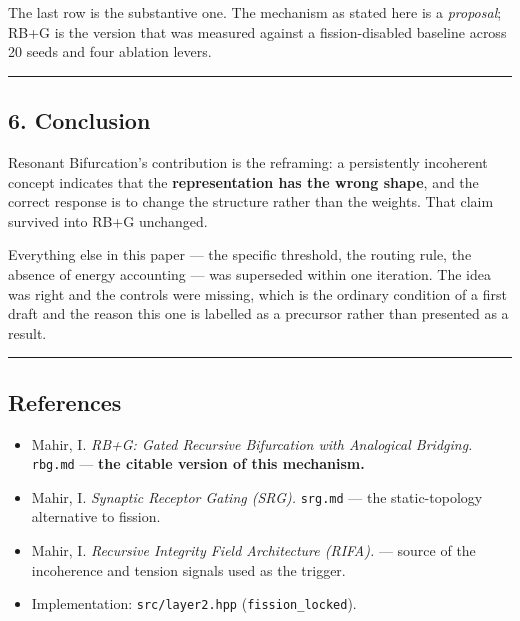 \documentclass[
  11pt,
  a4paper,
]{article}
\providecommand{\tightlist}{%
  \setlength{\itemsep}{0pt}\setlength{\parskip}{0pt}}
\begin{document}
The last row is the substantive one. The mechanism as stated here is a
\emph{proposal}; RB+G is the version that was measured against a
fission-disabled baseline across 20 seeds and four ablation levers.

\begin{center}\rule{0.5\linewidth}{0.5pt}\end{center}

\subsection{6. Conclusion}\label{conclusion}

Resonant Bifurcation's contribution is the reframing: a persistently
incoherent concept indicates that the \textbf{representation has the
wrong shape}, and the correct response is to change the structure rather
than the weights. That claim survived into RB+G unchanged.

Everything else in this paper --- the specific threshold, the routing
rule, the absence of energy accounting --- was superseded within one
iteration. The idea was right and the controls were missing, which is
the ordinary condition of a first draft and the reason this one is
labelled as a precursor rather than presented as a result.

\begin{center}\rule{0.5\linewidth}{0.5pt}\end{center}

\subsection{References}\label{references}

\begin{itemize}
\tightlist
\item
  Mahir, I. \emph{RB+G: Gated Recursive Bifurcation with Analogical
  Bridging.} \texttt{rbg.md} --- \textbf{the citable version of this
  mechanism.}
\item
  Mahir, I. \emph{Synaptic Receptor Gating (SRG).} \texttt{srg.md} ---
  the static-topology alternative to fission.
\item
  Mahir, I. \emph{Recursive Integrity Field Architecture (RIFA).} ---
  source of the incoherence and tension signals used as the trigger.
\item
  Implementation: \texttt{src/layer2.hpp} (\texttt{fission\_locked}).
\end{itemize}
\end{document}
